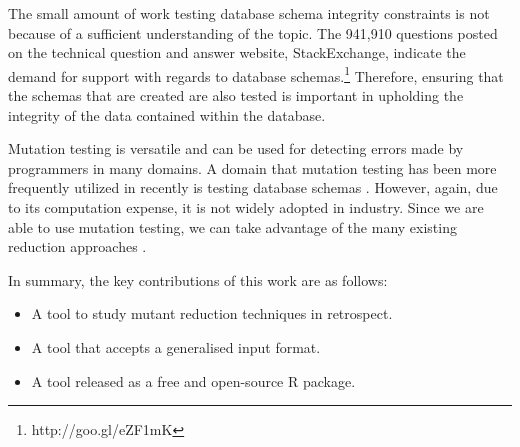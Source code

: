 The small amount of work testing database schema integrity constraints is not
because of a sufficient understanding of the topic. The 941,910 questions posted on
the technical question and answer website, StackExchange, indicate the demand for support
with regards to database schemas.\footnote{http://goo.gl/eZF1mK} Therefore, ensuring that
the schemas that are created are also tested is important in upholding the integrity
of the data contained within the database.

Mutation testing is versatile and can be used for detecting errors made by programmers in many domains.
A domain that mutation testing has been more frequently utilized in recently is testing database
schemas \cite{mcminn2016virtual, mcminn2015effectiveness, wright2013efficient}. However,
again, due to its computation expense, it is not widely adopted in industry. Since we
are able to use mutation testing, we can take advantage of the many
existing reduction approaches \cite{jia2011analysis, wong1995reducing, offutt1993experimental, offutt2001mutation}.

    In summary, the key contributions of this work are as follows:
    \begin{itemize}
        \item A tool to study mutant reduction techniques in retrospect.
        \item A tool that accepts a generalised input format.
        \item A tool released as a free and open-source R package.
    \end{itemize}
